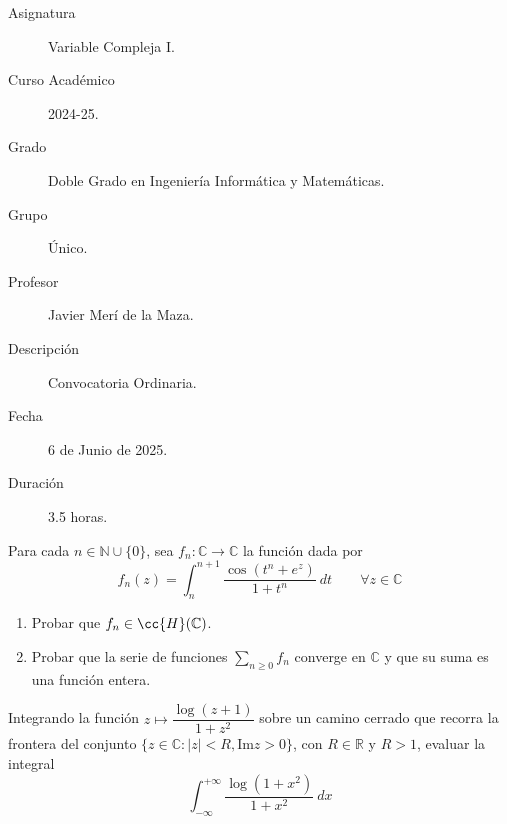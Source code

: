 \documentclass[12pt]{article}
\begin{document}

    
    

    \begin{description}
        \item[Asignatura] Variable Compleja I.
        \item[Curso Académico] 2024-25.
        \item[Grado] Doble Grado en Ingeniería Informática y Matemáticas.
        \item[Grupo] Único.
        \item[Profesor] Javier Merí de la Maza.
        \item[Descripción] Convocatoria Ordinaria.
        \item[Fecha] 6 de Junio de 2025.
        \item[Duración] 3.5 horas.
    \end{description}
    \newpage

    \begin{ejercicio}[2.5 puntos]
        Para cada $n\in \mathbb{N}\cup \{0\}$, sea $f_n:\mathbb{C}\to\mathbb{C}$ la función dada por
        \begin{equation*}
            f_n(z) = \int_{n}^{n+1} \dfrac{\cos(t^n+e^z)}{1+t^n}~dt  \qquad \forall z\in \mathbb{C}
        \end{equation*}
        \begin{enumerate}[label=\alph*)]
            \item Probar que $f_n\in \cc{H}(\mathbb{C})$.
            \item Probar que la serie de funciones $\sum\limits_{n\geq 0} f_n$ converge en $\mathbb{C}$ y que su suma es una función entera.
        \end{enumerate}
    \end{ejercicio}

    \begin{ejercicio}[2.5 puntos]
        Integrando la función $z\longmapsto \dfrac{\log(z+1)}{1+z^2}$ sobre un camino cerrado que recorra la frontera del conjunto $\{z\in \mathbb{C} : |z| < R, \text{Im}z > 0\}$, con $R\in \mathbb{R}$ y $R>1$, evaluar la integral
        \begin{equation*}
            \int_{-\infty}^{+\infty} \dfrac{\log(1+x^2)}{1+x^2}~dx 
        \end{equation*}
    \end{ejercicio}
\end{document}

